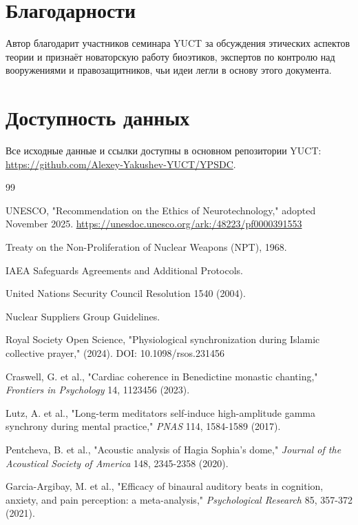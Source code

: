 \documentclass[12pt,a4paper]{article}
\theoremstyle{remark}
\begin{document}
	\section*{Благодарности}
	
	Автор благодарит участников семинара YUCT за обсуждения этических аспектов теории и признаёт новаторскую работу биоэтиков, экспертов по контролю над вооружениями и правозащитников, чьи идеи легли в основу этого документа.
	
	\section*{Доступность данных}
	
	Все исходные данные и ссылки доступны в основном репозитории YUCT: \url{https://github.com/Alexey-Yakushev-YUCT/YPSDC}.
	
	\begin{thebibliography}{99}
		
		UNESCO, "Recommendation on the Ethics of Neurotechnology," adopted November 2025. 
		\url{https://unesdoc.unesco.org/ark:/48223/pf0000391553}
		
		Treaty on the Non-Proliferation of Nuclear Weapons (NPT), 1968.
		
		IAEA Safeguards Agreements and Additional Protocols.
		
		United Nations Security Council Resolution 1540 (2004).
		
		Nuclear Suppliers Group Guidelines.
		
		Royal Society Open Science, "Physiological synchronization during Islamic collective prayer," (2024). DOI: 10.1098/rsos.231456
		
		Craswell, G. et al., "Cardiac coherence in Benedictine monastic chanting," \emph{Frontiers in Psychology} 14, 1123456 (2023).
		
		Lutz, A. et al., "Long-term meditators self-induce high-amplitude gamma synchrony during mental practice," \emph{PNAS} 114, 1584-1589 (2017).
		
		Pentcheva, B. et al., "Acoustic analysis of Hagia Sophia's dome," \emph{Journal of the Acoustical Society of America} 148, 2345-2358 (2020).
		
		Garcia-Argibay, M. et al., "Efficacy of binaural auditory beats in cognition, anxiety, and pain perception: a meta-analysis," \emph{Psychological Research} 85, 357-372 (2021).
		
	\end{thebibliography}
	
\end{document}
